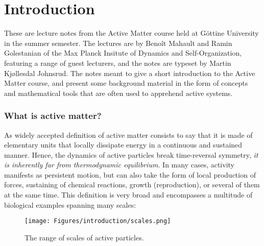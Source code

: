 \chapter{Introduction}

These are lecture notes from the Active Matter course held at Göttine University in the summer semester.
The lectures are by Benoît Mahault and Ramin Golestanian of the Max Planck Insitute of Dynamics and Self-Organization, featuring a range of guest lecturers, and the notes are typeset by Martin Kjøllesdal Johnsrud.
The notes meant to give a short introduction to the Active Matter course, and present some background material in the form of concepts and mathematical tools that are often used to apprehend active systems.



\subsection{What is active matter?}


As widely accepted definition of active matter consists to say that it is made of elementary units that locally dissipate energy in a continuous and sustained manner. Hence, the dynamics of active particles break time-reversal symmetry, \textit{it is inherently far from thermodynamic equilibrium}. In many cases, activity manifests as persistent motion, but can also take the form of local production of forces, sustaining of chemical reactions, growth (reproduction), or several of them at the same time. This definition is very broad and encompasses a multitude of biological examples spanning many scales:

\begin{figure}[!htb]
    \centering
    \texttt{[image: Figures/introduction/scales.png]}
    \caption{The range of scales of active particles.}
    \label{fig: scales active particles}
\end{figure}




